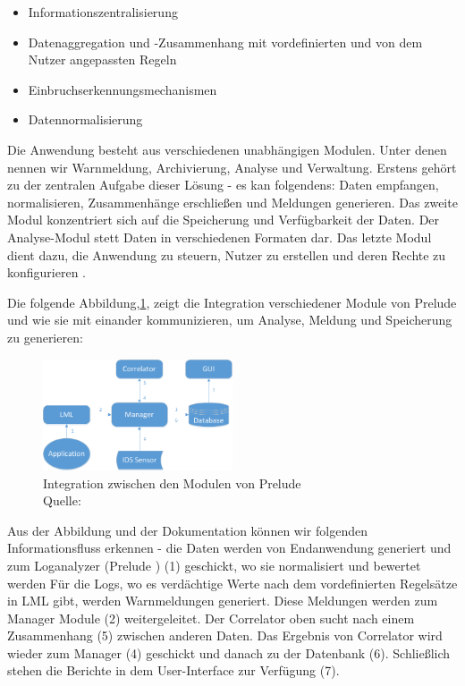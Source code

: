 \begin{itemize}[noitemsep]
   \item	Informationszentralisierung 
   \item	Datenaggregation und -Zusammenhang mit vordefinierten und von dem Nutzer angepassten Regeln 
   \item	Einbruchserkennungsmechanismen 
   \item	Datennormalisierung 
\end{itemize}

Die Anwendung besteht aus verschiedenen unabhängigen Modulen. Unter denen nennen wir Warnmeldung, Archivierung, Analyse und Verwaltung. Erstens gehört zu der zentralen Aufgabe dieser Lösung - es kan folgendens: Daten empfangen, normalisieren, Zusammenhänge erschließen und Meldungen generieren. Das zweite Modul  konzentriert sich auf die Speicherung und Verfügbarkeit der Daten. Der Analyse-Modul stett Daten in verschiedenen Formaten dar. Das letzte Modul dient dazu, die Anwendung zu steuern, Nutzer zu erstellen und deren Rechte zu konfigurieren \citep{EC_Prelude}. 

\newpage
Die folgende Abbildung,\ref{fig:Module_preludes}, zeigt die Integration verschiedener Module von Prelude und wie sie mit einander kommunizieren, um Analyse, Meldung und Speicherung zu generieren:

\begin{figure}[H]
   \centering
   \includegraphics[width=0.5\textwidth]{assets/2_p3.png}
   \caption[Integration zwischen den Modulen von Prelude ]
   {Integration zwischen den Modulen von Prelude \\Quelle: \citep{Prelude_MU} }
   \label{fig:Module_preludes}
   \centering
\end{figure}

Aus der Abbildung und der Dokumentation können wir folgenden Informationsfluss erkennen - die Daten werden von Endanwendung generiert und zum Loganalyzer (Prelude ) (1) geschickt, wo sie normalisiert und bewertet werden Für die Logs, wo es verdächtige Werte nach dem vordefinierten Regelsätze in \gls{LML} gibt, werden Warnmeldungen generiert. Diese Meldungen werden zum Manager Module (2) weitergeleitet. Der Correlator oben sucht nach einem Zusammenhang (5) zwischen anderen Daten. Das Ergebnis von Correlator wird wieder zum Manager (4) geschickt und danach zu der Datenbank (6). Schließlich stehen die Berichte in dem User-Interface zur Verfügung (7)\citep{Prelude_Doc}.

